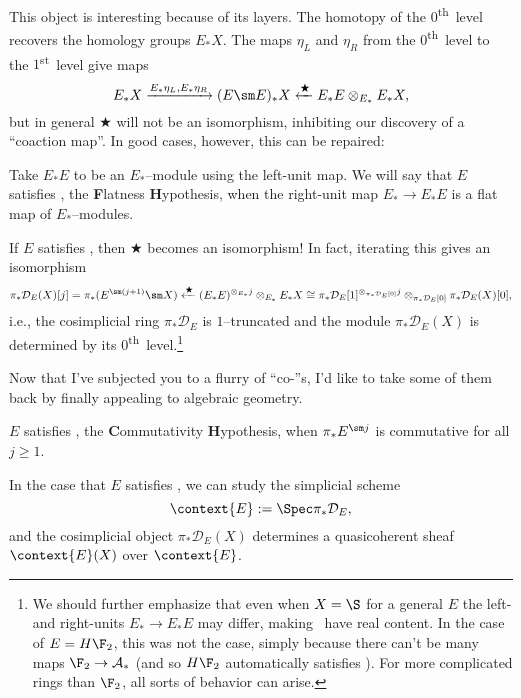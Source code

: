 This object is interesting because of its layers.  The homotopy of the $0$\textsuperscript{th}\, level recovers the homology groups $E_* X$.  The maps $\eta_L$ and $\eta_R$ from the $0$\textsuperscript{th}\, level to the $1$\textsuperscript{st}\, level give maps \[E_* X \xrightarrow{E_* \eta_L, E_* \eta_R} (E \sm E)_* X \xleftarrow{\bigstar} E_* E \otimes_{E_*} E_* X,\] but in general $\bigstar$ will not be an isomorphism, inhibiting our discovery of a ``coaction map''.  In good cases, however, this can be repaired:

\begin{definition}
Take $E_* E$ to be an $E_*$--module using the left-unit map.  We will say that $E$ satisfies \FH, the \textbf Flatness \textbf Hypothesis, when the right-unit map $E_* \to E_* E$ is a flat map of $E_*$--modules.
\end{definition}

\noindent If $E$ satisfies \FH, then $\bigstar$ becomes an isomorphism!  In fact, iterating this gives an isomorphism \[\pi_* \mathcal D_E(X)[j] = \pi_* (E^{\sm (j + 1)} \sm X) \xleftarrow{\bigstar} (E_* E)^{\otimes_{E_*} j} \otimes_{E_*} E_* X \cong \pi_* \mathcal D_E[1]^{\otimes_{\pi_* \mathcal D_E[0]} j} \otimes_{\pi_* \mathcal D_E[0]} \pi_* \mathcal D_E(X)[0],\] i.e., the cosimplicial ring $\pi_* \mathcal D_E$ is $1$--truncated and the module $\pi_* \mathcal D_E(X)$ is determined by its $0$\textsuperscript{th}\, level.\footnote{We should further emphasize that even when $X = \S$ for a general $E$ the left- and right-units $E_* \to E_* E$ may differ, making \FH\, have real content.  In the case of $E = H\F_2$, this was not the case, simply because there can't be many maps $\F_2 \to \mathcal A_*$ (and so $H\F_2$ automatically satisfies \FH).  For more complicated rings than $\F_2$, all sorts of behavior can arise.}

Now that I've subjected you to a flurry of ``co-''s, I'd like to take some of them back by finally appealing to algebraic geometry.

\begin{definition}
$E$ satisfies \CH, the \textbf Commutativity \textbf Hypothesis, when $\pi_* E^{\sm j}$ is commutative for all $j \ge 1$.
\end{definition}
\noindent In the case that $E$ satisfies \CH, we can study the simplicial scheme \[\context{E} := \Spec \pi_* \mathcal D_E,\] and the cosimplicial object $\pi_* \mathcal D_E(X)$ determines a quasicoherent sheaf $\context{E}(X)$ over $\context{E}$.

